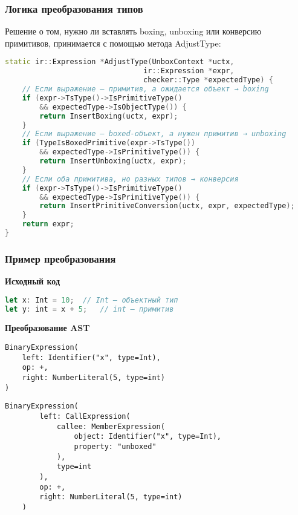 \subsubsection{Логика преобразования типов}
Решение о том, нужно ли вставлять boxing, unboxing или конверсию примитивов, принимается с помощью метода AdjustType:
\begin{lstlisting}[language=C++,caption=Метод AdjustType]
static ir::Expression *AdjustType(UnboxContext *uctx,
                                ir::Expression *expr,
                                checker::Type *expectedType) {
    // Если выражение — примитив, а ожидается объект → boxing
    if (expr->TsType()->IsPrimitiveType()
        && expectedType->IsObjectType()) {
        return InsertBoxing(uctx, expr);
    }
    // Если выражение — boxed-объект, а нужен примитив → unboxing
    if (TypeIsBoxedPrimitive(expr->TsType())
        && expectedType->IsPrimitiveType()) {
        return InsertUnboxing(uctx, expr);
    }
    // Если оба примитива, но разных типов → конверсия
    if (expr->TsType()->IsPrimitiveType()
        && expectedType->IsPrimitiveType()) {
        return InsertPrimitiveConversion(uctx, expr, expectedType);
    }
    return expr;
}
\end{lstlisting}

\subsubsection{Пример преобразования}

\textbf{Исходный код}
\begin{lstlisting}[language=TypeScript]
let x: Int = 10;  // Int — объектный тип
let y: int = x + 5;   // int — примитив
\end{lstlisting}

\textbf{Преобразование AST}
\begin{lstlisting}[caption=AST до оптимизации]
BinaryExpression(
    left: Identifier("x", type=Int),
    op: +,
    right: NumberLiteral(5, type=int)
)
\end{lstlisting}


\begin{lstlisting}[caption=AST после оптимизации]
    BinaryExpression(
        left: CallExpression(
            callee: MemberExpression(
                object: Identifier("x", type=Int),
                property: "unboxed"
            ),
            type=int
        ),
        op: +,
        right: NumberLiteral(5, type=int)
    )
\end{lstlisting}


\newpage
